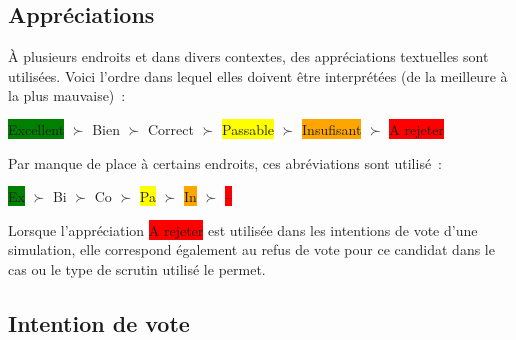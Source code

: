 \documentclass[../report]{subfiles}
\begin{document}
  \subsection{Appréciations}
  
  À plusieurs endroits et dans divers contextes, des appréciations textuelles sont utilisées. 
  Voici l'ordre dans lequel elles doivent être interprétées (de la meilleure à la plus mauvaise)~:
  
  \begin{center}
  	\colorbox{green}{Excellent} $\succ$
  	\colorbox{green!50!yellow}{Bien} $\succ$
  	\colorbox{green!25!yellow}{Correct} $\succ$
  	\colorbox{yellow}{Passable} $\succ$
  	\colorbox{orange}{Insufisant} $\succ$
  	\colorbox{red}{A rejeter}
  \end{center}

  Par manque de place à certains endroits, ces abréviations sont utilisé~:

  \begin{center}
	\colorbox{green}{Ex} $\succ$
	\colorbox{green!50!yellow}{Bi} $\succ$
	\colorbox{green!25!yellow}{Co} $\succ$
	\colorbox{yellow}{Pa} $\succ$
	\colorbox{orange}{In} $\succ$
	\colorbox{red}{--}
  \end{center}

  Lorsque l'appréciation \colorbox{red}{A rejeter} est utilisée dans les intentions de vote d'une simulation, 
  elle correspond également au refus de vote pour ce candidat dans le cas ou le type de scrutin utilisé le permet.
  
  \subsection{Intention de vote}
  
\end{document}
